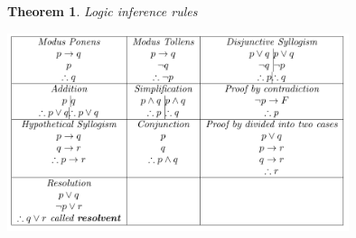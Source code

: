 \documentclass{article}
\newtheorem{thm}{Theorem}
\begin{document}
\begin{thm}
	Logic inference rules
	
	\begin{center}
		\includegraphics*[width=10cm]{inference_rule.PNG}
	\end{center}
	

\end{thm}
\end{document}
